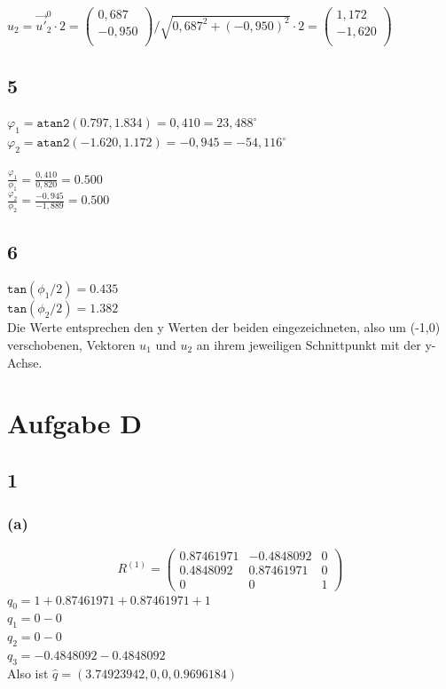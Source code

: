 \documentclass{../Vorlage/mat}
\begin{document}
$u_2 = \vec{u'}^0_2 \cdot 2 = 
\begin{pmatrix}
0,687\\
-0,950\\
\end{pmatrix} / \sqrt{0,687^2+(-0,950)^2} \cdot 2 = 
\begin{pmatrix}
1,172\\
-1,620\\
\end{pmatrix}
$

\subsection*{5}
$ \varphi_1 = \mathtt{atan2}(0.797,1.834) = 0,410 = 23,488^\circ$\\
$ \varphi_2 = \mathtt{atan2}(-1.620,1.172) = -0,945 = -54,116^\circ$\\
\\
$ \frac{\varphi_1}{\phi_1} = \frac{0,410}{0,820} = 0.500$\\
$ \frac{\varphi_2}{\phi_2} = \frac{-0,945}{-1,889} = 0.500$

\subsection*{6}
$\mathtt{tan}(\phi_1/2) = 0.435$\\
$\mathtt{tan}(\phi_2/2) = 1.382$\\

Die Werte entsprechen den y Werten der beiden eingezeichneten, also um (-1,0) verschobenen, Vektoren $u_1$ und $u_2$ an ihrem jeweiligen Schnittpunkt mit der y-Achse.


\section*{Aufgabe D}
\subsection*{1}
\subsubsection*{(a)}
\begin{equation}
	R^{(1)} = \begin{pmatrix}
	0.87461971 & -0.4848092 & 0 \\
	0.4848092 & 0.87461971 & 0\\
	0&0&1
	\end{pmatrix}
\end{equation}
$q_0 = 1 + 0.87461971 + 0.87461971 + 1$\\
$q_1 = 0 - 0$\\
$q_2 = 0 - 0$\\
$q_3 = -0.4848092 - 0.4848092$\\
Also ist $\hat{q} = (3.74923942, 0, 0, 0.9696184)$
\end{document}
